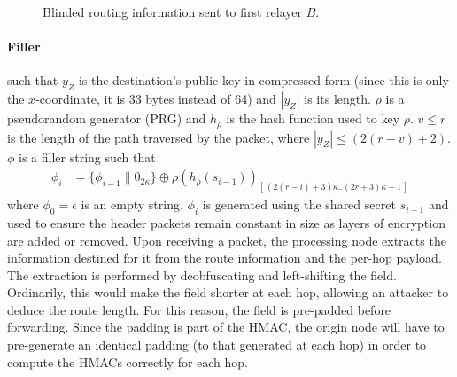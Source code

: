 \begin{figure}[H]
    \caption{Blinded routing information sent to first relayer $B$.}
\end{figure}

\paragraph{Filler}



such that $y_Z$ is the destination's public key in compressed form (since this is only the $x$-coordinate, it is 33 bytes instead of 64) and $|y_Z|$ is its length. $\rho$ is a pseudorandom generator (PRG) and $h_{\rho}$ is the hash function used to key $\rho$.
$v\leq r$ is the length of the path traversed by the packet, where $|y_Z| \leq (2(r - v) + 2)$. $\phi$ is a filler string such that
\begin{align}
    \phi_i & =\{ \phi_{i-1}\|0_{2\kappa}\}\oplus \rho(h_{\rho}(s_{i-1}))_{[ \,(2(r-i)+3)\kappa..(2r+3)\kappa-1\,]}
\end{align}
where $\phi_0=\epsilon$ is an empty string. $\phi_i$ is generated using the shared secret $s_{i-1}$ and used to ensure the header packets remain constant in size as layers of encryption are added or removed. Upon receiving a packet, the processing node extracts the information destined for it from the route information and the per-hop payload. The extraction is performed by deobfuscating and left-shifting the field. Ordinarily, this would make the field shorter at each hop, allowing an attacker to deduce the route length. For this reason, the field is pre-padded before forwarding. Since the padding is part of the HMAC, the origin node will have to pre-generate an identical padding (to that generated at each hop) in order to compute the HMACs correctly for each hop.

